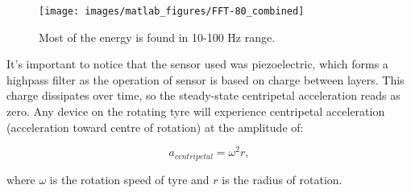\begin{figure}[htb]
\begin{center}
\texttt{[image: images/matlab\_figures/FFT-80\_combined]}
\end{center}
\caption{Most of the energy is found in 10-100 Hz range.}
\label{80_FFT_zoom}
\end{figure}

It's important to notice that the sensor used was piezoelectric, which forms a highpass filter as the operation of sensor is based on charge between layers. This charge dissipates over time, so the steady-state centripetal acceleration reads as zero. Any device on the rotating tyre will experience centripetal acceleration (acceleration toward centre of rotation) at the amplitude of: 

\begin{equation}
  a_{centripetal} = \omega^2 r,
\end{equation}

where $\omega$ is the rotation speed of tyre and $r$ is the radius of rotation.